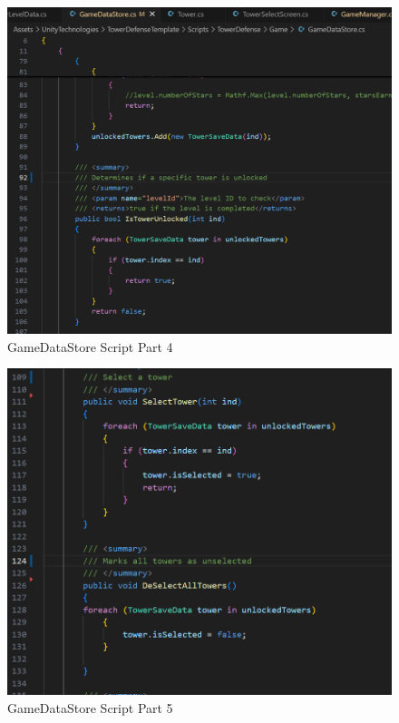\documentclass[12pt,a4paper]{report}
\begin{document}
\begin{figure}[h!]
	\centering
	\includegraphics[scale=0.75]{images/GameDataStore4.png}
	\caption{GameDataStore Script Part 4}
	\label{fig:GameDataStore4}
\end{figure}
 
\begin{figure}[h!]
	\centering
	\includegraphics[scale=0.75]{images/GameDataStore5.png}
	\caption{GameDataStore Script Part 5}
	\label{fig:GameDataStore5}
\end{figure}
 
\end{document}
